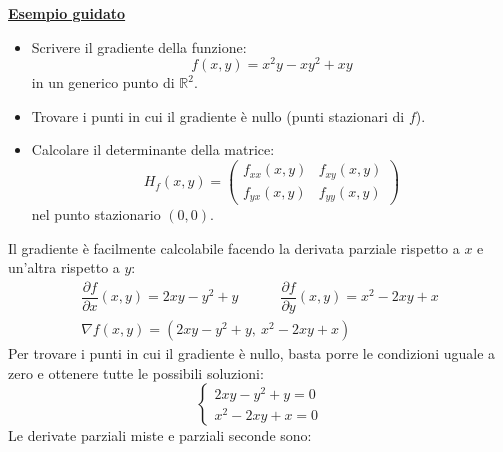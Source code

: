 \documentclass[a4paper]{article}
\newcommand{\example}[1]{\textcolor{Green4}{\textbf{#1}}}
\begin{document}
	\begin{flushleft}
		\example{\underline{Esempio guidato}}
	\end{flushleft}
	\begin{itemize}
		\item Scrivere il gradiente della funzione:
		\begin{equation*}
			f\left(x,y\right) = x^{2}y - xy^{2} + xy
		\end{equation*}
		in un generico punto di $\mathbb{R}^{2}$.

		\item Trovare i punti in cui il gradiente è nullo (punti stazionari di $f$).

		\item Calcolare il determinante della matrice:
		\begin{equation}\label{eq: matrice Hessiana}
			H_{f}\left(x,y\right) = 
			\begin{pmatrix}
				f_{xx}\left(x,y\right) & f_{xy}\left(x,y\right) \\
				f_{yx}\left(x,y\right) & f_{yy}\left(x,y\right)
			\end{pmatrix}
		\end{equation}
		nel punto stazionario $\left(0,0\right)$.
	\end{itemize}
	Il gradiente è facilmente calcolabile facendo la derivata parziale rispetto a $x$ e un'altra rispetto a $y$:
	\begin{gather*}
		\dfrac{\partial f}{\partial x} \left(x,y\right) = 2xy - y^{2} + y 
		\hspace{3em}
		\dfrac{\partial f}{\partial y} \left(x,y\right) = x^{2} - 2xy + x \\
		\nabla f \left(x,y\right) = \left(2xy - y^{2} + y, \: x^{2} - 2xy + x\right)
	\end{gather*}
	Per trovare i punti in cui il gradiente è nullo, basta porre le condizioni uguale a zero e ottenere tutte le possibili soluzioni:
	\begin{equation*}
		\begin{cases}
			2xy - y^{2} + y = 0 \\
			x^{2} - 2xy + x = 0
		\end{cases}
	\end{equation*}
	Le derivate parziali miste e parziali seconde sono:
\end{document}

